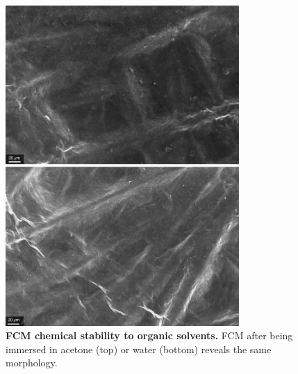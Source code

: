 \begin{figure}
  \centering
  \includegraphics[width=3.5in]{paper5/FigS7.pdf}
  \caption{\textbf{FCM chemical stability to organic solvents.} FCM after being immersed in acetone (top) or water (bottom) reveals the same morphology.}
  \label{figS7_AppD}
\end{figure}


